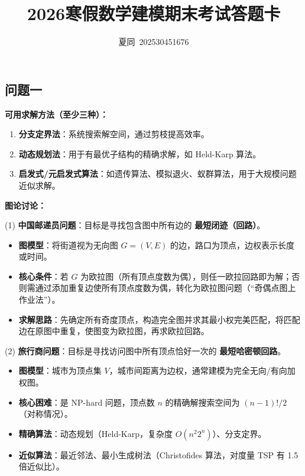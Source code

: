 \documentclass[UTF8]{article}
\title{2026寒假数学建模期末考试答题卡}
\author{夏同~202530451676}
\begin{document}
\maketitle

\subsection*{问题一}
\textbf{可用求解方法（至少三种）：}
\begin{enumerate}[label=(\arabic*), leftmargin=2em]
    \item \textbf{分支定界法}：系统搜索解空间，通过剪枝提高效率。
    \item \textbf{动态规划法}：用于有最优子结构的精确求解，如 Held-Karp 算法。
    \item \textbf{启发式/元启发式算法}：如遗传算法、模拟退火、蚁群算法，用于大规模问题近似求解。
\end{enumerate}

\textbf{图论讨论：}
\vspace{0.5em}

(1) \textbf{中国邮递员问题}：目标是寻找包含图中所有边的 \textbf{最短闭迹（回路）}。
\begin{itemize}[leftmargin=1.5em]
    \item \textbf{图模型}：将街道视为无向图 $G=(V,E)$ 的边，路口为顶点，边权表示长度或时间。
    \item \textbf{核心条件}：若 $G$ 为欧拉图（所有顶点度数为偶），则任一欧拉回路即为解；否则需通过添加重复边使所有顶点度数为偶，转化为欧拉图问题（“奇偶点图上作业法”）。
    \item \textbf{求解思路}：先确定所有奇度顶点，构造完全图并求其最小权完美匹配，将匹配边在原图中重复，使图变为欧拉图，再求欧拉回路。
\end{itemize}

(2) \textbf{旅行商问题}：目标是寻找访问图中所有顶点恰好一次的 \textbf{最短哈密顿回路}。
\begin{itemize}[leftmargin=1.5em]
    \item \textbf{图模型}：城市为顶点集 $V$，城市间距离为边权，通常建模为完全无向/有向加权图。
    \item \textbf{核心困难}：是 NP-hard 问题，顶点数 $n$ 的精确解搜索空间为 $(n-1)!/2$（对称情况）。
    \item \textbf{精确算法}：动态规划（Held-Karp，复杂度 $O(n^2 2^n)$）、分支定界。
    \item \textbf{近似算法}：最近邻法、最小生成树法（Christofides 算法，对度量 TSP 有 1.5 倍近似比）。
\end{itemize}
\end{document}
